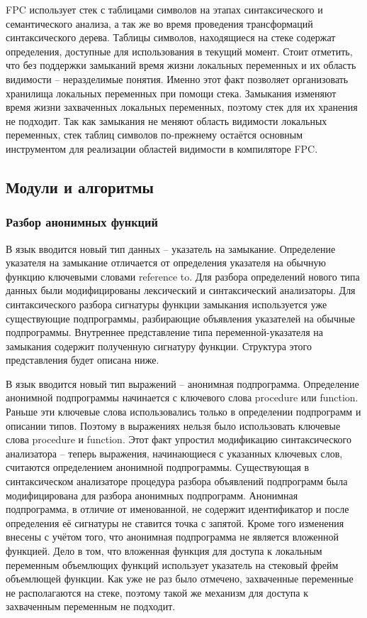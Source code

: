 \documentclass{imcs}
\begin{document}
FPC использует стек с таблицами символов на этапах синтаксического и семантического анализа, а так же во время
проведения трансформаций синтаксического дерева. Таблицы символов, находящиеся на стеке содержат
определения, доступные для использования в текущий момент. Стоит отметить, что без поддержки замыканий
время жизни локальных переменных и их область видимости -- неразделимые понятия. Именно этот факт позволяет
организовать хранилища локальных переменных при помощи стека. Замыкания изменяют время жизни захваченных
локальных переменных, поэтому стек для их хранения не подходит. Так как замыкания не меняют область видимости
локальных переменных, стек таблиц символов по-прежнему остаётся основным инструментом для реализации
областей видимости в компиляторе FPC.

\subsection{Модули и алгоритмы}

\subsubsection{Разбор анонимных функций}

В язык вводится новый тип данных -- указатель на замыкание. Определение указателя на замыкание отличается от
определения указателя на обычную функцию ключевыми словами reference to. Для разбора определений нового типа
данных были модифицированы лексический и синтаксический анализаторы. Для синтаксического разбора сигнатуры функции
замыкания используется уже существующие подпрограммы, разбирающие объявления
указателей на обычные подпрограммы. Внутреннее представление типа переменной-указателя на замыкания содержит
полученную сигнатуру функции. Структура этого представления будет описана ниже. 

В язык вводится новый тип выражений -- анонимная подпрограмма. Определение анонимной подпрограммы начинается
с ключевого слова procedure или function. Раньше эти ключевые слова использовались только
в определении подпрограмм и описании типов. Поэтому в выражениях нельзя было
использовать ключевые слова procedure и function. Этот факт упростил модификацию синтаксического анализатора -- 
теперь выражения, начинающиеся с указанных ключевых слов, считаются определением анонимной подпрограммы.
Существующая в синтаксическом анализаторе процедура разбора объявлений подпрограмм была модифицирована
для разбора анонимных подпрограмм. Анонимная подпрограмма, в отличие от именованной, не содержит
идентификатор и после определения её сигнатуры не ставится точка с запятой. 
Кроме того изменения внесены с учётом того, 
что анонимная подпрограмма не является вложенной функцией.
Дело в том, что вложенная функция для доступа к локальным переменным объемлющих функций использует
указатель на стековый фрейм объемлющей функции. Как уже не раз было отмечено, захваченные переменные
не располагаются на стеке, поэтому такой же механизм для доступа к захваченным переменным не подходит.
\end{document}
